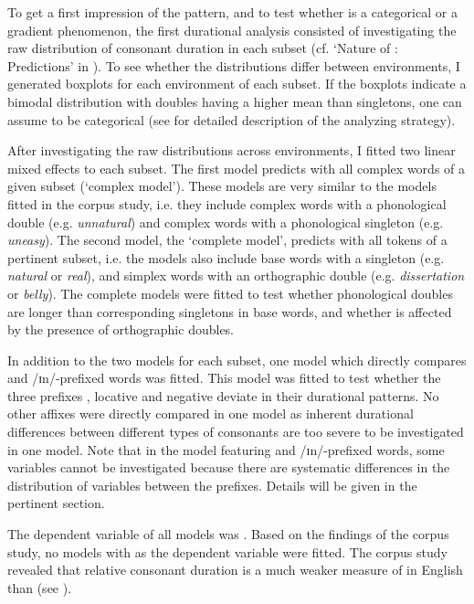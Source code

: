 To get a first impression of the  pattern, and to test whether  is a categorical or a gradient phenomenon, the first durational analysis consisted of investigating the raw distribution of consonant duration in each subset (cf. `Nature of : Predictions' in ). To see whether the distributions differ between environments, I generated boxplots for each environment of each subset. 
If the boxplots indicate a bimodal distribution with doubles having a higher mean than singletons, one can assume  to be categorical (see  for detailed description of the analyzing strategy). 

After investigating the raw distributions across environments, I fitted two linear mixed effects  to each subset. 
The first model predicts  with all complex words of a given subset (`complex model'). These models are very similar to the models fitted in the corpus study, i.e. they include complex words with a phonological double (e.g. \textit{unnatural}) and complex words with a phonological singleton (e.g. \textit{uneasy}). 
The second model, the `complete model', predicts  with all tokens of a pertinent subset, i.e. the models also include base words with a singleton (e.g. \textit{natural} or \textit{real}), and simplex words with an orthographic double (e.g. \textit{dissertation} or \textit{belly}). The complete models were fitted to test whether phonological doubles are longer than corresponding singletons in base words, and whether  is affected by the presence of orthographic doubles. 

In addition to the two models for each subset, one model which directly compares  and /ɪn/-prefixed words was fitted. This model was fitted to test whether the three prefixes , locative  and negative  deviate in their durational patterns. No other affixes were directly compared in one model as inherent durational differences between different types of consonants are too severe to be investigated in one model. Note that in the model featuring  and /ɪn/-prefixed words, some variables cannot be investigated because there are systematic differences in the distribution of variables between the prefixes. Details will be given in the pertinent section.


The dependent variable of all models was . Based on the findings of the corpus study, no models with  as the dependent variable were fitted.  The corpus study revealed that relative consonant duration is a much weaker measure of  in English than  (see ).

